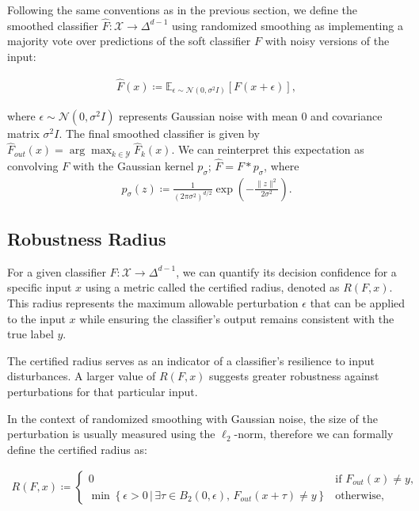 Following the same conventions as in the previous section, we define the smoothed classifier $\hat{F}: \mathcal{X} \rightarrow \Delta^{d-1}$ using randomized smoothing as implementing a majority vote over predictions of the soft classifier $F$ with noisy versions of the input:

\begin{align*}
    \hat{F}(x) \coloneqq \mathbb{E}_{\epsilon \sim \mathcal{N}(0, \sigma^2 I)} [F(x + \epsilon)],
\end{align*}

where $\epsilon \sim \mathcal{N}(0, \sigma^2 I)$ represents Gaussian noise with mean $0$ and covariance matrix $\sigma^2 I$.
The final smoothed classifier is given by $\hat{F}_{out}(x) = \arg\max_{k \in \mathcal{Y}} \hat{F}_k(x)$.
We can reinterpret this expectation as convolving $F$ with the Gaussian kernel $p_\sigma$; $\hat{F} = F * p_\sigma$, where
\begin{align*}
    p_\sigma(z) \coloneqq \frac{1}{(2\pi\sigma^2)^{d/2}} \exp\left(-\frac{\|z\|^2}{2\sigma^2}\right).
\end{align*}

\subsection{Robustness Radius}\label{subsec:robustness-radius}

For a given classifier $F: \mathcal{X} \rightarrow \Delta^{d-1}$, we can quantify its decision confidence for a specific input $x$ using a metric called the certified radius, denoted as $R(F,x)$.
This radius represents the maximum allowable perturbation $\epsilon$ that can be applied to the input $x$ while ensuring the classifier's output remains consistent with the true label $y$.

The certified radius serves as an indicator of a classifier's resilience to input disturbances.
A larger value of $R(F,x)$ suggests greater robustness against perturbations for that particular input.

In the context of randomized smoothing with Gaussian noise, the size of the perturbation is usually measured using the $\ell_2$-norm, therefore we can formally define the certified radius as:

\begin{align*}
    R(F,x) \coloneqq
    \begin{cases}
        0 & \text{if } F_{out}(x) \neq y, \\[2ex]
        \min \left\{ \epsilon > 0 \,|\, \exists \tau \in B_2(0,\epsilon),\, F_{out}(x + \tau) \neq y \right\} & \text{otherwise,}
    \end{cases}
\end{align*}

